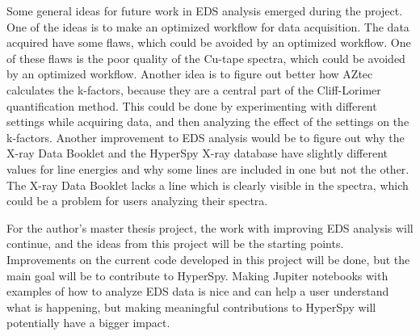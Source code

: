 Some general ideas for future work in EDS analysis emerged during the project.
One of the ideas is to make an optimized workflow for data acquisition.
The data acquired have some flaws, which could be avoided by an optimized workflow.
One of these flaws is the poor quality of the Cu-tape spectra, which could be avoided by an optimized workflow.
Another idea is to figure out better how AZtec calculates the k-factors, because they are a central part of the Cliff-Lorimer quantification method.
This could be done by experimenting with different settings while acquiring data, and then analyzing the effect of the settings on the k-factors.
Another improvement to EDS analysis would be to figure out why the X-ray Data Booklet and the HyperSpy X-ray database have slightly different values for line energies and why some lines are included in one but not the other.
The X-ray Data Booklet lacks a line which is clearly visible in the spectra, which could be a problem for users analyzing their spectra.







For the author's master thesis project, the work with improving EDS analysis will continue, and the ideas from this project will be the starting points.
Improvements on the current code developed in this project will be done, but the main goal will be to contribute to HyperSpy.
Making Jupiter notebooks with examples of how to analyze EDS data is nice and can help a user understand what is happening, but making meaningful contributions to HyperSpy will potentially have a bigger impact.






